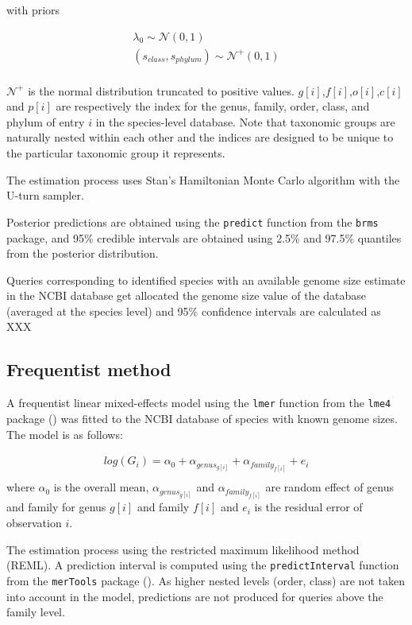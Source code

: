 \documentclass[
]{article}
\begin{document}
with priors

\begin{gather*}
\lambda_0 \sim \mathcal{N}(0,1) \\
(s_{class},s_{phylum}) \sim \mathcal{N}^+(0,1) \\
\end{gather*}

\(\mathcal{N}^+\) is the normal distribution truncated to positive
values. \(g[i]\),\(f[i]\),\(o[i]\),\(c[i]\) and \(p[i]\) are
respectively the index for the genus, family, order, class, and phylum
of entry \(i\) in the species-level database. Note that taxonomic groups
are naturally nested within each other and the indices are designed to
be unique to the particular taxonomic group it represents.

The estimation process uses Stan's Hamiltonian Monte Carlo algorithm
with the U-turn sampler.

Posterior predictions are obtained using the \texttt{predict} function
from the \texttt{brms} package, and 95\% credible intervals are obtained
using 2.5\% and 97.5\% quantiles from the posterior distribution.

Queries corresponding to identified species with an available genome
size estimate in the NCBI database get allocated the genome size value
of the database (averaged at the species level) and 95\% confidence
intervals are calculated as XXX

\subsection{Frequentist method}\label{frequentist-method}

A frequentist linear mixed-effects model using the \texttt{lmer}
function from the \texttt{lme4} package
() was fitted to the
NCBI database of species with known genome sizes. The model is as
follows:

\begin{gather*}
log(G_i) =  \alpha_0 + \alpha_{genus_{g[i]}} +  \alpha_{family_{f[i]}} + e_i \\
\end{gather*} where \(\alpha_0\) is the overall mean,
\(\alpha_{genus_{g[i]}}\) and \(\alpha_{family_{f[i]}}\) are random
effect of genus and family for genus \(g[i]\) and family \(f[i]\) and
\(e_i\) is the residual error of observation \(i\).

The estimation process using the restricted maximum likelihood method
(REML). A prediction interval is computed using the
\texttt{predictInterval} function from the \texttt{merTools} package
(). As
higher nested levels (order, class) are not taken into account in the
model, predictions are not produced for queries above the family level.
\end{document}
